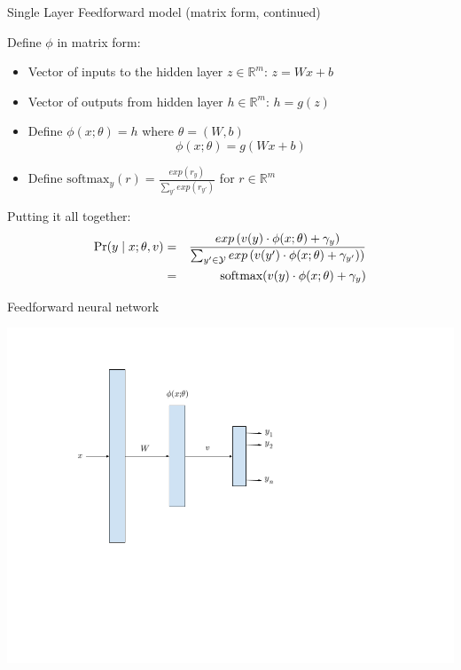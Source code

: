 \begin{frame}{Single Layer Feedforward model (matrix form, continued)}
\begin{block}{Define $\phi$ in matrix form:}
\begin{itemize}[<+->]
\item Vector of inputs to the hidden layer $z \in \mathbb{R}^m$: $z = Wx + b$
\item Vector of outputs from hidden layer $h \in \mathbb{R}^m$: $h = g(z)$
\item Define $\phi(x; \theta) = h$ where $\theta = (W, b)$
\[ \phi(x; \theta) = g(Wx + b) \]
\item Define $\textrm{softmax}_y(r) = \frac{exp(r_y)}{\sum_{y'} exp(r_{y'})}$ for $r \in \mathbb{R}^m$
\end{itemize}
\end{block}
\pause
\begin{block}{Putting it all together:}
\begin{eqnarray*}
\Pr(y \mid x; \theta, v) &=& \frac{exp\left(v(y) \cdot \phi(x;\theta) + \gamma_y \right)}{\sum_{y' \in {\cal Y}} exp\left(v(y') \cdot \phi(x;\theta) + \gamma_{y'})\right)} \\
 &=& \textrm{softmax}(v(y) \cdot \phi(x;\theta) + \gamma_y) 
\end{eqnarray*}
\end{block}

\end{frame}

\begin{frame}{Feedforward neural network}
\begin{block}{}
\centering
\includegraphics[scale=0.4]{figures/ffnet.png}
\end{block}
\end{frame}

